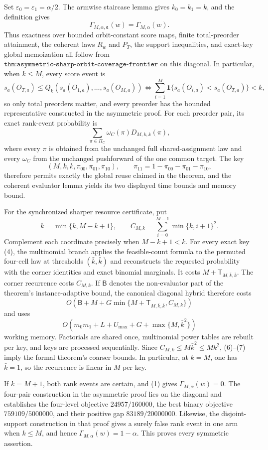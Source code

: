 Set \(\varepsilon_0=\varepsilon_1=\alpha/2\). The armwise staircase lemma gives \(k_0=k_1=k\), and the definition gives
\[
\Gamma_{M,\alpha,\boldsymbol\varepsilon}(w)=\Gamma_{M,\alpha}(w).
\tag{1}
\]
Thus exactness over bounded orbit-constant score maps, finite total-preorder attainment, the coherent laws \(R_w\) and \(P_T\), the support inequalities, and exact-key global memoization all follow from \(\texttt{thm:asymmetric-sharp-orbit-coverage-frontier}\) on this diagonal. In particular, when \(k\le M\), every score event is
\[
s_a(O_{T,a})\le Q_k(s_a(O_{1,a}),\ldots,s_a(O_{M,a}))
\Longleftrightarrow
\sum_{i=1}^M\mathbf 1\{s_a(O_{i,a})<s_a(O_{T,a})\}<k,
\tag{2}
\]
so only total preorders matter, and every preorder has the bounded representative constructed in the asymmetric proof. For each preorder pair, its exact rank-event probability is
\[
\sum_{\pi\in\Pi_C}\omega_C(\pi)D_{M,k,k}(\pi),
\tag{3}
\]
where every \(\pi\) is obtained from the unchanged full shared-assignment law and every \(\omega_C\) from the unchanged pushforward of the one common target. The key
\[
(M,k,k,\pi_{00},\pi_{01},\pi_{10}),\qquad \pi_{11}=1-\pi_{00}-\pi_{01}-\pi_{10},
\tag{4}
\]
therefore permits exactly the global reuse claimed in the theorem, and the coherent evaluator lemma yields its two displayed time bounds and memory bound.

For the synchronized sharper resource certificate, put
\[
\bar k=\min\{k,M-k+1\},\qquad C_{M,k}=\sum_{i=0}^{M-1}\min\{\bar k,i+1\}^2.
\tag{5}
\]
Complement each coordinate precisely when \(M-k+1<k\). For every exact key (4), the multinomial branch applies the feasible-count formula to the permuted four-cell law at thresholds \((\bar k,\bar k)\) and reconstructs the requested probability with the corner identities and exact binomial marginals. It costs \(M+\mathsf T_{M,\bar k,\bar k}\). The corner recurrence costs \(C_{M,k}\). If \(\mathsf B\) denotes the non-evaluator part of the theorem's instance-adaptive bound, the canonical diagonal hybrid therefore costs
\[
O\!\left(\mathsf B+M+G\min\{M+\mathsf T_{M,\bar k,\bar k},C_{M,k}\}\right)
\tag{6}
\]
and uses
\[
O\!\left(m_0m_1+L+U_{\max}+G+\max\{M,\bar k^2\}\right)
\tag{7}
\]
working memory. Factorials are shared once, multinomial power tables are rebuilt per key, and keys are processed sequentially. Since \(C_{M,k}\le M\bar k^2\le Mk^2\), (6)--(7) imply the formal theorem's coarser bounds. In particular, at \(k=M\), one has \(\bar k=1\), so the recurrence is linear in \(M\) per key.

If \(k=M+1\), both rank events are certain, and (1) gives \(\Gamma_{M,\alpha}(w)=0\). The four-pair construction in the asymmetric proof lies on the diagonal and establishes the four-level objective \(24957/160000\), the best binary objective \(759109/5000000\), and their positive gap \(83189/20000000\). Likewise, the disjoint-support construction in that proof gives a surely false rank event in one arm when \(k\le M\), and hence \(\Gamma_{M,\alpha}(w)=1-\alpha\). This proves every symmetric assertion.